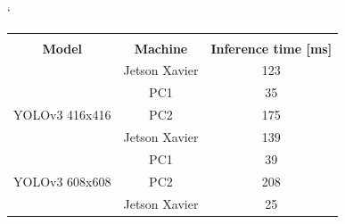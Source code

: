 \documentclass[twoside]{ctuthesis}
\theoremstyle{plain}
\theoremstyle{definition}
\theoremstyle{note}
\begin{document}
\begin{table}[hbt]
\catcode`
\begin{tabular}{|c|c|c|}
\hline
\cellcolor[HTML]{C0C0C0}                                 & \cellcolor[HTML]{C0C0C0}                                   & \cellcolor[HTML]{C0C0C0}                                                   \\
\multirow{-2}{*}{\cellcolor[HTML]{C0C0C0}\textbf{Model}} & \multirow{-2}{*}{\cellcolor[HTML]{C0C0C0}\textbf{Machine}} & \multirow{-2}{*}{\cellcolor[HTML]{C0C0C0}\textbf{Inference time {[}ms{]}}} \\ \hline
                                                         & Jetson Xavier                                              & 123                                                                        \\ \cline{2-3} 
                                                         & PC1                                                        & 35                                                                         \\ \cline{2-3} 
\multirow{-3}{*}{YOLOv3 416x416}                         & PC2                                                        & 175                                                                        \\ \hline
                                                         & Jetson Xavier                                              & 139                                                                        \\ \cline{2-3} 
                                                         & PC1                                                        & 39                                                                         \\ \cline{2-3} 
\multirow{-3}{*}{YOLOv3 608x608}                         & PC2                                                        & 208                                                                        \\ \hline
                                                         & Jetson Xavier                                              & 25                                                                         \\ \cline{2-3} 

\end{tabular}
\end{table}
\end{document}
